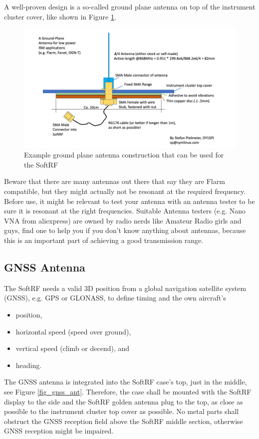 \documentclass[11pt,a4paper]{article}
\begin{document}
A well-proven design is a so-called ground plane antenna on top of the instrument cluster cover, like shown in Figure \ref{groundplane}.

\begin{figure}[h]
\includegraphics[scale=.5]{gp-antenna.png}
\caption{Example ground plane antenna construction that can be used for the SoftRF}\label{groundplane}
\end{figure}\FloatBarrier

Beware that there are many antennas out there that say they are Flarm compatible, but they might actually not be resonant at the required frequency. Before use, it might be relevant to test your antenna with an antenna tester to be sure it is resonant at the right frequencies. Suitable Antenna testers (e.g. Nano VNA from aliexpress) are owned by radio nerds like Amateur Radio girls and guys, find one to help you if you don't know anything about antennas, because this is an important part of achieving a good transmission range.

\subsection{GNSS Antenna}
The SoftRF needs a valid 3D position from a global navigation satellite system (GNSS), e.g. GPS or GLONASS, to define timing and the own aircraft's

\begin{itemize}
\item position,
\item horizontal speed (speed over ground),
\item vertical speed (climb or decend), and
\item heading.
\end{itemize}

The GNSS antenna is integrated into the SoftRF case's top, just in the middle, see Figure \ref{fig_gnss_ant}. Therefore, the case shall be mounted with the SoftRF display to the side and the SoftRF golden antenna plug to the top, as close as possible to the instrument cluster top cover as possible. No metal parts shall obstruct the GNSS reception field above the SoftRF middle section, otherwise GNSS reception might be impaired. 
\end{document}
